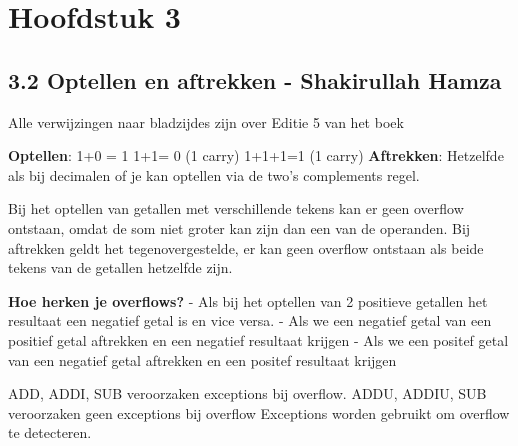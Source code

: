\newpage

\section{Hoofdstuk 3}									%

\subsection{3.2 Optellen en aftrekken - Shakirullah Hamza}							%
\begin{figure}
\end{figure}

Alle verwijzingen naar bladzijdes zijn over Editie 5 van het boek

\textbf{Optellen}: 1+0 = 1	1+1= 0 (1 carry)		1+1+1=1 (1 carry)
\textbf{Aftrekken}: Hetzelfde als bij decimalen of je kan optellen via de two’s complements regel. 

Bij het optellen van getallen met verschillende tekens kan er geen overflow ontstaan, omdat de som niet groter kan zijn dan een van de operanden.
Bij aftrekken geldt het tegenovergestelde, er kan geen overflow ontstaan als beide tekens van de getallen hetzelfde zijn.

\textbf{Hoe herken je overflows?}
- Als bij het optellen van 2 positieve getallen het resultaat een negatief getal is en vice versa.
- Als we een negatief getal van een positief getal aftrekken en een negatief resultaat krijgen
- Als we een positef getal van een negatief getal aftrekken en een positef resultaat krijgen

ADD, ADDI, SUB veroorzaken exceptions bij overflow.
ADDU, ADDIU, SUB veroorzaken geen exceptions bij overflow
Exceptions worden gebruikt om overflow te detecteren.

